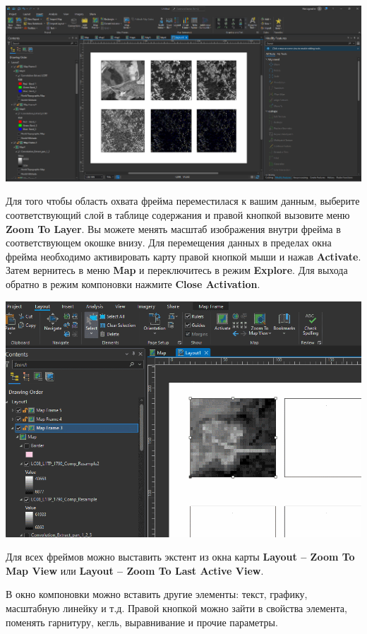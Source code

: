 \documentclass[
  12pt,
]{book}
\begin{document}
\includegraphics{images/Ref01/Map_Frames.png}

Для того чтобы область охвата фрейма переместилася к вашим данным, выберите соответствующий слой в таблице содержания и правой кнопкой вызовите меню \textbf{Zoom To Layer}. Вы можете менять масштаб изображения внутри фрейма в соответствующем окошке внизу. Для перемещения данных в пределах окна фрейма необходимо активировать карту правой кнопкой мыши и нажав \textbf{Activate}. Затем вернитесь в меню \textbf{Map} и переключитесь в режим \textbf{Explore}. Для выхода обратно в режим компоновки нажмите \textbf{Close Activation}.

\includegraphics{images/Ref01/Map_Frame_Activation.gif}

Для всех фреймов можно выставить экстент из окна карты \textbf{Layout -- Zoom To Map View} или \textbf{Layout -- Zoom To Last Active View}.

В окно компоновки можно вставить другие элементы: текст, графику, масштабную линейку и т.д. Правой кнопкой можно зайти в свойства элемента, поменять гарнитуру, кегль, выравнивание и прочие параметры.
\end{document}
